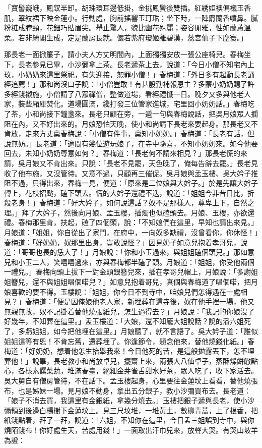 \begin{showcontents}{}
「寶髻巍峨，鳳釵半卸。胡珠環耳邊低掛，金挑鳳鬢後雙插。紅綉姖襖偏襯玉香肌，翠紋裙下映金蓮小。行動處，胸前搖響玉玎璫；坐下時，一陣麝蘭香噴鼻。膩粉粧成脖頸，花鈿巧貼眉尖。舉止驚人，貌比幽花殊麗；姿容閒雅，性如蘭蕙溫柔。若非綺閣生成，定是蘭房長就。儼若紫府瓊姬離碧漢，蕊宮仙子下塵寰。」

那長老一面掀簾子，請小夫人方丈明間內，上面獨獨安放一張公座椅兒。春梅坐下，長老參見已畢，小沙彌拿上茶。長老遞茶上去，說道：「今日小僧不知宅內上玟，小奶奶來這里祭祀，有失迎接，恕罪小僧！」春梅道：「外日多有起動長老誦經追薦！」那和尚沒口子說：「小僧豈敢！有甚殷勤補報恩主？多蒙小奶奶賜了許多經錢襯施，小僧請了八眾禪僧，整做道場，看經禮懺一日。晚夕又多與他老人家，裝些廂庫焚化。道場圓滿，纔打發三位管家進城，宅里回小奶奶話。」春梅吃了茶，小和尚接下鐘盞來。長老只顧在旁，一遞一句與春梅說話，把吳月娘眾人攔阻在內，又不好出來的。月娘恐怕天晚，使小和尚請下長老來要起身。那長老又不肯放，走來方丈稟春梅說：「小僧有件事，稟知小奶奶。」春梅道：「長老有話，但說無妨。」長老道：「適間有幾位遊玩娘子，在寺中隨喜，不知小奶奶來。如今他要回去，未知小奶奶尊意如何？」春梅道：「長老何不請來相見？」那長老慌的來請，吳月娘又不肯出來。只說：「長老不見罷，天色晚了，俺每告辭去罷。」長老見收了他布施，又沒管待。又意不過，只顧再三催促。吳月娘與孟玉樓、吳大妗子推阻不過，只得出來，春梅一見，便道：「原來是二位娘與大妗子。」於是先讓大妗子轉上，花枝招颭，磕下頭去。慌的大妗子還禮不迭，說道：「姐姐今非昔日比，折殺老身！」春梅道：「好大妗子，如何說這話？奴不是那樣人，尊卑上下，自然之理。」拜了大妗子，然後向月娘、孟玉樓，插燭也似磕頭去。月娘、玉樓，亦欲還禮。春梅那里肯，扶起，磕了四個頭，說：「不知娘們在這里，早知也請出來見。」月娘道：「姐姐，你自從出了家門，在府中，一向奴多缺禮，沒曾看你，你休怪！」春梅道：「好奶奶，奴那里出身，豈敢說怪？」因見奶子如意兒抱着孝哥兒，說道：「哥哥也長的恁大了！」月娘說：「你和小玉過來，與姐姐磕個頭兒。」那如意兒和小玉二人，笑嘻嘻過來，亦與春梅都半磕了頭。月娘道：「姐姐，你受他兩個一禮兒。」春梅向頭上拔下一對金頭銀簪兒來，插在孝哥兒帽上，月娘說：「多謝姐姐簪兒，還不與姐姐唱個喏兒？」如意兒抱着哥兒，真個與春梅道了唱個喏，把月娘喜歡的要不得。玉樓說：「姐姐，你今日不到寺中，咱娘兒們怎得遇在一處相見？」春梅道：「便是因俺娘他老人家，新埋葬在這寺後，奴在他手裡一場，他又無親無故，奴不記掛着替他燒張紙兒，怎生過得去？」月娘說：「我記的你娘沒了好幾年，不知葬在這里。」孟玉樓道：「大娘，還不知龐大姐說話？說的潘六姐死了，多虧姐姐，如今把他埋在這里。」月娘聽了，就不言語了。吳大妗子道：「誰似姐姐這等有恩！不肯忘舊，還葬埋了。你逢節令，題念他來，替他燒錢化紙。」春梅道：「好奶奶，想着他怎生抬舉我來！今日他死的苦，是這般拋露丟下，怎不埋葬他！」說畢，長老教小和尚放卓兒，擺齋上來，兩張大八仙卓子，蒸酥煠餅饊點心，各樣素饌菜蔬，堆滿春臺，絕細金芽雀舌甜水好茶，眾人吃了，收下家活去。吳大舅自有僧房管待，不在話下。孟玉樓起身，心里要往金蓮坟上看看，替他燒張布，也是姊妹一場。見月娘不動身，拿出五分銀子，教小沙彌買布去。長老道：「娘子不消去買，我這里有金銀紙，拿幾分燒去。」玉樓把銀子遞與長老，使小沙彌領到後邊白楊樹下金蓮坟上。見三尺坟堆，一堆黃土，數柳青蒿，上了根香，把紙錢點着，拜了一拜，說道：「六姐，不知你在這里，今日孟三姐誤到寺中，與你燒陌錢布！你好處生天，苦處用錢！」一面取出汗巾兒來，放聲大哭。有哭山坡羊為證：


\end{showcontents}
